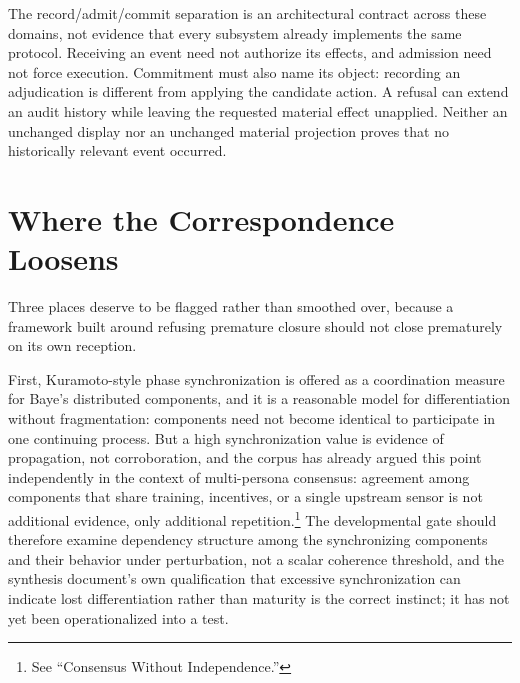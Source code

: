 \documentclass[11pt]{article}
\begin{document}
The record/admit/commit separation is an architectural contract across these domains, not evidence that every subsystem already implements the same protocol. Receiving an event need not authorize its effects, and admission need not force execution. Commitment must also name its object: recording an adjudication is different from applying the candidate action. A refusal can extend an audit history while leaving the requested material effect unapplied. Neither an unchanged display nor an unchanged material projection proves that no historically relevant event occurred.

\section{Where the Correspondence Loosens}

Three places deserve to be flagged rather than smoothed over, because a framework built around refusing premature closure should not close prematurely on its own reception.

First, Kuramoto-style phase synchronization is offered as a coordination measure for Baye's distributed components, and it is a reasonable model for differentiation without fragmentation: components need not become identical to participate in one continuing process. But a high synchronization value is evidence of propagation, not corroboration, and the corpus has already argued this point independently in the context of multi-persona consensus: agreement among components that share training, incentives, or a single upstream sensor is not additional evidence, only additional repetition.\footnote{See ``Consensus Without Independence.''} The developmental gate should therefore examine dependency structure among the synchronizing components and their behavior under perturbation, not a scalar coherence threshold, and the synthesis document's own qualification that excessive synchronization can indicate lost differentiation rather than maturity is the correct instinct; it has not yet been operationalized into a test.
\end{document}
